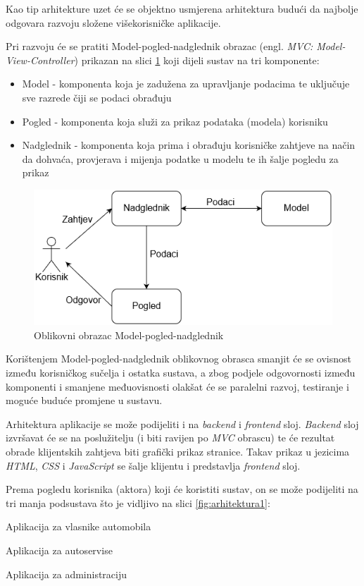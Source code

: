 		
		Kao tip arhitekture uzet će se objektno usmjerena arhitektura budući da najbolje odgovara razvoju složene višekorisničke aplikacije. 
		
		Pri razvoju će se pratiti Model-pogled-nadglednik obrazac (engl. \textit{MVC: Model-View-Controller}) prikazan na slici \ref{fig:mvc} koji dijeli sustav na tri komponente:
		\begin{itemize}
			\item Model - komponenta koja je zadužena za upravljanje podacima te uključuje sve razrede čiji se podaci obrađuju
			\item Pogled - komponenta koja služi za prikaz podataka (modela) korisniku
			\item Nadglednik - komponenta koja prima i obrađuju korisničke zahtjeve na način da dohvaća, provjerava i mijenja podatke u modelu te ih šalje pogledu za prikaz
		\end{itemize}
		
		\begin{figure}[h]
			\centering
			\includegraphics[width=0.7\linewidth]{slike/mvc}
			\caption{Oblikovni obrazac Model-pogled-nadglednik}
			\label{fig:mvc}
		\end{figure}
		
		Korištenjem Model-pogled-nadglednik oblikovnog obrasca smanjit će se ovisnost između korisničkog sučelja i ostatka sustava, a zbog podjele odgovornosti između komponenti i smanjene međuovisnosti olakšat će se paralelni razvoj, testiranje i moguće buduće promjene u sustavu.
		
		Arhitektura aplikacije se može podijeliti i na \textit{backend} i \textit{frontend} sloj. \textit{Backend} sloj izvršavat će se na poslužitelju (i biti ravijen po \textit{MVC} obrascu) te će rezultat obrade klijentskih zahtjeva biti grafički prikaz stranice. Takav prikaz u jezicima \textit{HTML}, \textit{CSS} i \textit{JavaScript} se šalje klijentu i predstavlja \textit{frontend} sloj.
		
		Prema pogledu korisnika (aktora) koji će koristiti sustav, on se može podijeliti na tri manja podsustava što je vidljivo na slici \ref{fig:arhitektura1}:
		\begin{packed_item}
			\item Aplikacija za vlasnike automobila
			\item Aplikacija za autoservise
			\item Aplikacija za administraciju 
		\end{packed_item}
	
